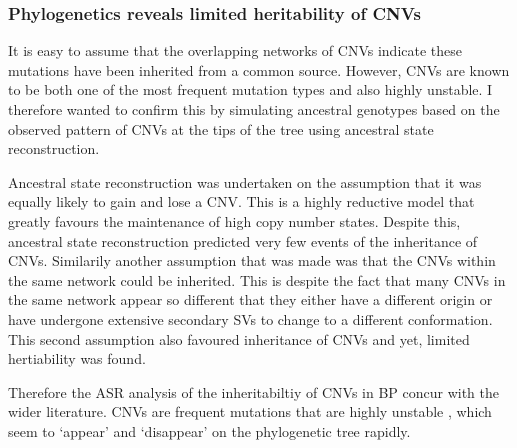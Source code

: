 \documentclass{article}
\begin{document}
\subsubsection{Phylogenetics reveals limited heritability of CNVs}

It is easy to assume that the overlapping networks of CNVs indicate these mutations have been inherited from a common source. However, CNVs are known to be both one of the most frequent mutation types and also highly unstable. I therefore wanted to confirm this by simulating ancestral genotypes based on the observed pattern of CNVs at the tips of the tree using ancestral state reconstruction.

Ancestral state reconstruction was undertaken on the assumption that it was equally likely to gain and lose a CNV. This is a highly reductive model that greatly favours the maintenance of high copy number states. Despite this, ancestral state reconstruction predicted very few events of the inheritance of CNVs. Similarily another assumption that was made was that the CNVs within the same network could be inherited. This is despite the fact that many CNVs in the same network appear so different that they either have a different origin or have undergone extensive secondary SVs to change to a different conformation. This second assumption also favoured inheritance of CNVs   and yet, limited hertiability was found.

Therefore the ASR analysis of the inheritabiltiy of CNVs in BP concur with the  wider literature. CNVs are frequent mutations that are highly unstable , which seem to `appear' and `disappear' on the phylogenetic tree rapidly.
\end{document}
